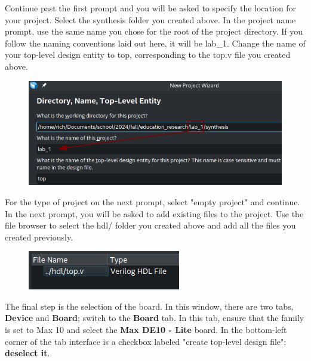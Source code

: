 \documentclass[12pt]{labmanual}
\begin{document}
Continue past the first prompt and you will be asked to specify the location for your project. Select the synthesis folder you created above. In the project name prompt, use the same name you chose for the root of the project directory. If you follow the naming conventions laid out here, it will be lab\_1. Change the name of your top-level design entity to top, corresponding to the top.v file you created above.

\begin{figure}[H]
    \centering
    \includegraphics[width=\columnwidth]{project_settings.png}
\end{figure}

For the type of project on the next prompt, select "empty project" and continue. In the next prompt, you will be asked to add existing files to the project. Use the file browser to select the hdl/ folder you created above and add all the files you created previously.

\begin{figure}[H]
    \centering
    \includegraphics[width=0.5\linewidth]{addfiles.png}
\end{figure}

The final step is the selection of the board. In this window, there are two tabs, \textbf{Device} and \textbf{Board}; switch to the \textbf{Board} tab. In this tab, ensure that the family is set to Max 10 and select the \textbf{Max DE10 - Lite} board. In the bottom-left corner of the tab interface is a checkbox labeled "create top-level design file"; \textbf{deselect it}.
\end{document}
